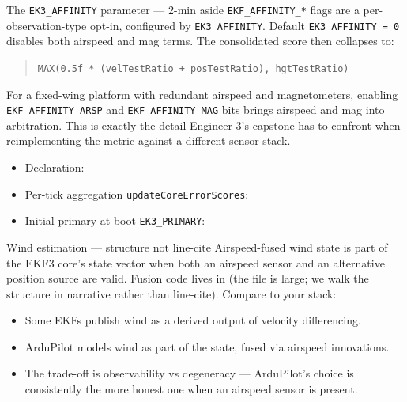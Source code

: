 \documentclass[aspectratio=169,11pt]{beamer}
\begin{document}
\begin{frame}{The \texttt{EK3\_AFFINITY} parameter --- 2-min aside}
  \texttt{EKF\_AFFINITY\_*} flags are a per-observation-type opt-in, configured by \texttt{EK3\_AFFINITY}.
  \vfill
  Default \texttt{EK3\_AFFINITY = 0} disables both airspeed and mag terms. The consolidated score then collapses to:
  \begin{quote}
    \texttt{MAX(0.5f * (velTestRatio + posTestRatio), hgtTestRatio)}
  \end{quote}
  \vfill
  For a fixed-wing platform with redundant airspeed and magnetometers, enabling \texttt{EKF\_AFFINITY\_ARSP} and \texttt{EKF\_AFFINITY\_MAG} bits brings airspeed and mag into arbitration.
  \vfill
  This is exactly the detail Engineer 3's capstone has to confront when reimplementing the metric against a different sensor stack.
  \begin{itemize}
    \item Declaration: 
    \item Per-tick aggregation \texttt{updateCoreErrorScores}: 
    \item Initial primary at boot \texttt{EK3\_PRIMARY}: 
  \end{itemize}
\end{frame}

\begin{frame}{Wind estimation --- structure not line-cite}
  Airspeed-fused wind state is part of the EKF3 core's state vector when both an airspeed sensor and an alternative position source are valid.
  \vfill
  Fusion code lives in  (the file is large; we walk the structure in narrative rather than line-cite).
  \vfill
  Compare to your stack:
  \begin{itemize}
    \item Some EKFs publish wind as a derived output of velocity differencing.
    \item ArduPilot models wind as part of the state, fused via airspeed innovations.
    \item The trade-off is observability vs degeneracy --- ArduPilot's choice is consistently the more honest one when an airspeed sensor is present.
  \end{itemize}
\end{frame}
\end{document}
